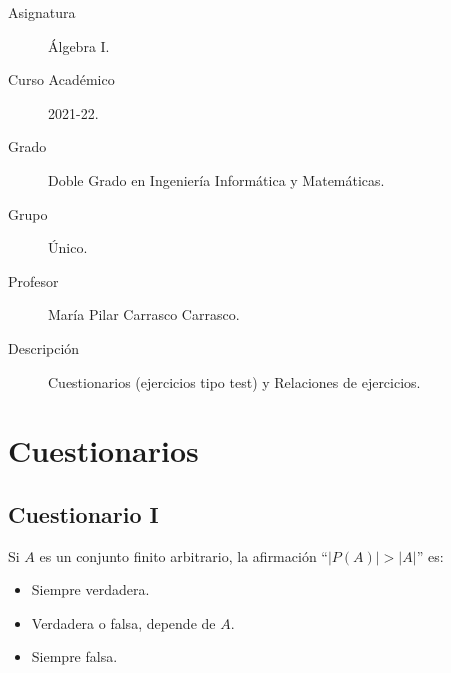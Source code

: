 \documentclass[12pt]{article}
\newcounter{ejercicio}[section] %
\newcounter{ejercicio}
\begin{document}

    
    

    \begin{description}
        \item[Asignatura] Álgebra I.
        \item[Curso Académico] 2021-22.
        \item[Grado] Doble Grado en Ingeniería Informática y Matemáticas.
        \item[Grupo] Único.
        \item[Profesor] María Pilar Carrasco Carrasco.
        \item[Descripción] Cuestionarios (ejercicios tipo test) y Relaciones de ejercicios.
    
    \end{description}


    \newpage
    
    \section{Cuestionarios} 
    \subsection{Cuestionario I}
    \begin{ejercicio}
        Si $A$ es un conjunto finito arbitrario, la afirmación ``$|P(A)| > |A|$'' es:
        \begin{itemize}
            \item Siempre verdadera.
            \item Verdadera o falsa, depende de $A$.
            \item Siempre falsa.
        \end{itemize}
    \end{ejercicio}
\end{document}
